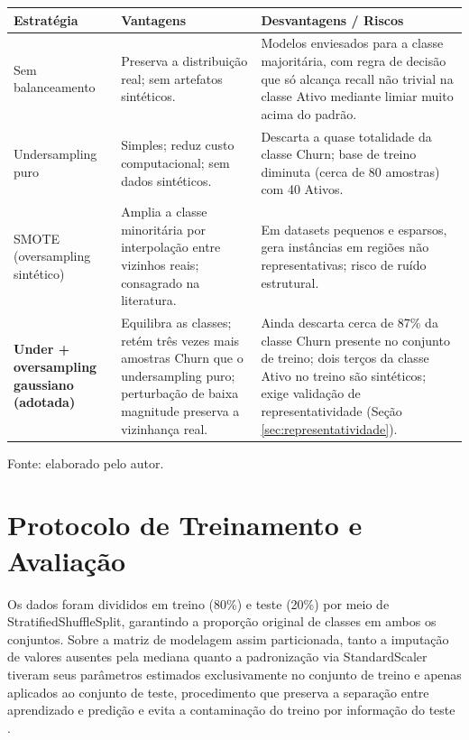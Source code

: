 \begin{quadro}[htbp]
\ABNTEXfontereduzida
\SingleSpacing
\caption{Análise comparativa de estratégias de balanceamento de classes}
\label{qua:estrategias-balanceamento}
\centering
\begin{tabular}{|>{\raggedright\arraybackslash}p{3.0cm}|>{\raggedright\arraybackslash}p{5.3cm}|>{\raggedright\arraybackslash}p{5.6cm}|}
\hline
\textbf{Estratégia} & \textbf{Vantagens} & \textbf{Desvantagens / Riscos} \\
\hline
Sem balanceamento & Preserva a distribuição real; sem artefatos sintéticos. & Modelos enviesados para a classe majoritária, com regra de decisão que só alcança recall não trivial na classe Ativo mediante limiar muito acima do padrão. \\
\hline
Undersampling puro & Simples; reduz custo computacional; sem dados sintéticos. & Descarta a quase totalidade da classe Churn; base de treino diminuta (cerca de 80 amostras) com 40 Ativos. \\
\hline
SMOTE (oversampling sintético) & Amplia a classe minoritária por interpolação entre vizinhos reais; consagrado na literatura. & Em datasets pequenos e esparsos, gera instâncias em regiões não representativas; risco de ruído estrutural. \\
\hline
\textbf{Under + oversampling gaussiano (adotada)} & Equilibra as classes; retém três vezes mais amostras Churn que o undersampling puro; perturbação de baixa magnitude preserva a vizinhança real. & Ainda descarta cerca de 87\% da classe Churn presente no conjunto de treino; dois terços da classe Ativo no treino são sintéticos; exige validação de representatividade (Seção \ref{sec:representatividade}). \\
\hline
\end{tabular}
\begin{flushleft}
	\ABNTEXfontereduzida
	\SingleSpacing
	Fonte: elaborado pelo autor.
\end{flushleft}
\end{quadro}

\FloatBarrier
\section{Protocolo de Treinamento e Avaliação} \label{sec:protocolo}

Os dados foram divididos em treino (80\%) e teste (20\%) por meio de StratifiedShuffleSplit, garantindo a proporção original de classes em ambos os conjuntos. Sobre a matriz de modelagem assim particionada, tanto a imputação de valores ausentes pela mediana quanto a padronização via StandardScaler tiveram seus parâmetros estimados exclusivamente no conjunto de treino e apenas aplicados ao conjunto de teste, procedimento que preserva a separação entre aprendizado e predição e evita a contaminação do treino por informação do teste \cite{kaufman2012}.

